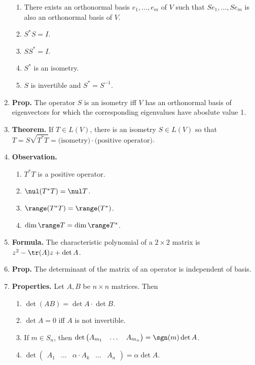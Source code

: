 \begin{enumerate}
\begin{enumerate}
		\item There exists an orthonormal basis $e_1,\dots,e_m$ of $V$ such that $Se_1,\dots,Se_m$ is also an orthonormal basis of $V$. 
		\item $S^*S = I$. 
		\item $SS^* = I$. 
		\item $S^*$ is an isometry. 
		\item $S$ is invertible and $S^* = S^{-1}$. 
	\end{enumerate}
	\item \textbf{Prop. } The operator $S$ is an isometry iff $V$ has an orthonormal basis of eigenvectors for which the corresponding eigenvalues have aboslute value 1. 
	\item \textbf{Theorem. } If $T \in L(V)$, there is an isometry $S \in L(V)$ so that $T = S \sqrt{T^*T} = \textrm{(isometry)} \cdot \textrm{(positive operator)}$. 
	\item \textbf{Observation. } 
	\begin{enumerate}
		\item $T^*T$ is a positive operator. 
		\item $\nul(T^*T) = \nul T$. 
		\item $\range(T^*T) = \range(T^*)$. 
		\item $\dim\range T = \dim\range T^*$. 
	\end{enumerate}
	\item \textbf{Formula. } The characteristic polynomial of a $2 \times 2$ matrix is $z^2 - \tr(A)z  +\det A$. 
	\item \textbf{Prop. } The determinant of the matrix of an operator is independent of basis. 
	\item \textbf{Properties. } Let $A,B$ be $n \times n$ matrices. Then 
	\begin{enumerate}
		\item $\det(AB) = \det A \cdot \det B$. 
		\item $\det A  = 0$ iff $A$ is not invertible. 
		\item If $m \in S_n$, then $\det \begin{pmatrix} A_{m_1} & \dots & A_{m_n} \end{pmatrix} = \sgn(m) \det A$. 
		\item $\det \begin{pmatrix} A_1 & \dots & \alpha \cdot A_k & \dots & A_n \end{pmatrix} = \alpha\det A$. 
	\end{enumerate}
\end{enumerate}


